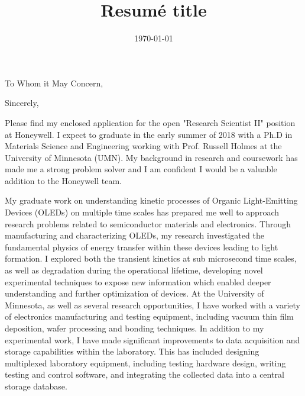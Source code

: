 \documentclass[11pt,a4paper,roman]{moderncv}        %
\title{Resumé title}                               %
\begin{document}
\date{\today}
\opening{To Whom it May Concern,}
\closing{Sincerely,}
\makelettertitle
\justify
Please find my enclosed application for the open "Research Scientist II" position at Honeywell.  
I expect to graduate in the early summer of 2018 with a  Ph.D in Materials Science and Engineering working with Prof. Russell Holmes at the University of Minnesota (UMN).  
My background in research and coursework has made me a strong problem solver and I am confident I would be a valuable addition to the Honeywell team.

My graduate work on understanding kinetic processes of Organic Light-Emitting Devices (OLEDs) on multiple time scales has prepared me well to approach research problems related to semiconductor materials and electronics.  
Through manufacturing and characterizing OLEDs, my research investigated the fundamental physics of energy transfer within these devices leading to light formation.  
I explored both the transient kinetics at sub microsecond time scales, as well as degradation during the operational lifetime, developing novel experimental techniques to expose new information which enabled deeper understanding and further optimization of devices. 
At the University of Minnesota, as well as several research opportunities, I have worked with a variety of electronics manufacturing and testing equipment, including vacuum thin film deposition, wafer processing and bonding techniques.
In addition to my experimental work, I have made significant improvements to data acquisition and storage capabilities within the laboratory.  
This has included designing multiplexed laboratory equipment, including testing hardware design, writing testing and control software, and integrating the collected data into a central storage database.  
\end{document}

